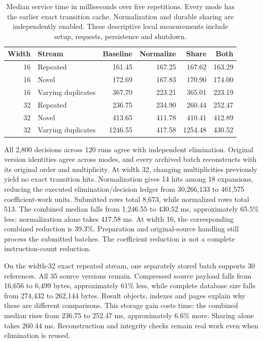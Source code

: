 \documentclass[11pt,a4paper]{article}
\numberwithin{equation}{section}
\theoremstyle{plain}
\theoremstyle{definition}
\theoremstyle{remark}
\begin{document}
\begin{table}[htbp]
\centering
\small
\setlength{\tabcolsep}{4pt}
\begin{tabular}{rlrrrr}
\hline
Width & Stream & Baseline & Normalize & Share & Both\\
\hline
16 & Repeated & 161.45 & 167.25 & 167.62 & 163.29 \\
16 & Novel & 172.69 & 167.83 & 170.90 & 174.00 \\
16 & Varying duplicates & 367.70 & 223.21 & 365.01 & 223.19 \\
32 & Repeated & 236.75 & 234.90 & 260.44 & 252.47 \\
32 & Novel & 413.65 & 411.78 & 410.41 & 412.89 \\
32 & Varying duplicates & 1246.55 & 417.58 & 1254.48 & 430.52 \\
\hline
\end{tabular}
\caption{Median service time in milliseconds over five repetitions. Every mode has the earlier exact transition cache. Normalization and durable sharing are independently enabled. These descriptive local measurements include setup, requests, persistence and shutdown.}
\label{tab:affine-batch-reuse}
\end{table}

All 2,800 decisions across 120 runs agree with independent elimination. Original version identities agree across modes, and every archived batch reconstructs with its original order and multiplicity. At width 32, changing multiplicities previously yield no exact transition hits. Normalization gives 14 hits among 18 expansions, reducing the executed elimination/decision ledger from 30,266,133 to 461,575 coefficient-work units. Submitted rows total 8,673, while normalized rows total 513. The combined median falls from 1,246.55 to 430.52 ms, approximately 65.5\% less; normalization alone takes 417.58 ms. At width 16, the corresponding combined reduction is 39.3\%. Preparation and original-source handling still process the submitted batches. The coefficient reduction is not a complete instruction-count reduction.

On the width-32 exact repeated stream, one separately stored batch supports 30 references. All 35 source versions remain. Compressed source payload falls from 16,656 to 6,499 bytes, approximately 61\% less, while complete database size falls from 274,432 to 262,144 bytes. Result objects, indexes and pages explain why these are different comparisons. This storage gain costs time: the combined median rises from 236.75 to 252.47 ms, approximately 6.6\% more. Sharing alone takes 260.44 ms. Reconstruction and integrity checks remain real work even when elimination is reused.
\end{document}
